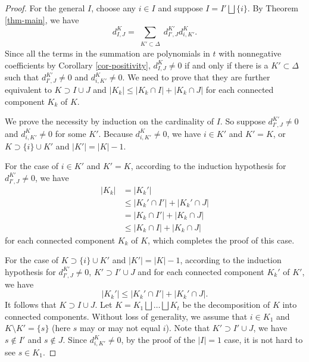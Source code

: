 \documentclass[11pt, letterpaper]{amsart}
\numberwithin{equation}{section}
\begin{document}
\begin{proof}
    For the general $I$, choose any \( i \in I \) and suppose \( I=I' \bigsqcup \{i\}  \). By Theorem \ref{thm-main}, we have  
\[ 
d_{I,J}^K = \sum_{\substack{K'\subset\Delta}} d_{I',J}^{K'} d_{i,K'}^K. 
\]  
    Since all the terms in the summation are polynomials in $t$ with nonnegative coefficients by Corollary \ref{cor-positivity}, \( d_{I,J}^K \neq 0 \) if and only if there is a \(K'\subset\Delta\) such that \( d_{I',J}^{K'}\neq 0\) and \(d_{i,K'}^{K} \neq 0 \). We need to prove that they are further equivalent to $K \supset I \cup J $ and $|K_k|\le|K_k\cap I| + |K_k\cap J|$ for each connected component $K_k$ of $K$. 

We prove the necessity by induction on the cardinality of \( I \). So suppose \( d_{I',J}^{K'}\neq 0\) and \(d_{i,K'}^{K} \neq 0 \) for some $K'$. Because \(d_{i,K'}^{K} \neq 0 \), we have $i\in K'$ and $K'=K$, or \( K\supset\{i\}\cup K' \) and \( |K'| = |K| - 1 \). 

For the case of $i\in K'$ and $K'=K$, according to the induction hypothesis for $d_{I',J}^{K'}\neq 0$, we have
\begin{equation*}
\begin{aligned}
    |K_k|&=|K_k'| \\
    &\le |K_k' \cap I'| + |K_k' \cap J|\\
    &=|K_k \cap I'| + |K_k \cap J|\\
     &\le |K_k \cap I| + |K_k \cap J|
    \end{aligned}
\end{equation*} 
for each connected component $K_k$ of $K$, 
which completes the proof of this case.

For the case of \( K\supset\{i\}\cup K' \) and \( |K'| = |K| - 1 \), according to the induction hypothesis for $d_{I',J}^{K'}\neq 0$, \(K' \supset I '\cup J \) and for each connected component \( K_k' \) of \( K' \),  we have
\begin{equation}\label{eq-K' connected}
    |K_k'| \le |K_k' \cap I'| + |K_k' \cap J|.
\end{equation} 
It follows that \(K \supset I \cup J \).
Let \( K = K_1 \bigsqcup \dots \bigsqcup K_t \) be the decomposition of \( K \) into connected components. Without loss of generality, we assume that \( i \in K_1 \) and \( K \setminus K'=\{s\} \) (here $s$ may or may not equal $i$).  Note that \( K' \supset I '\cup J \), we have \( s \notin I' \) and \( s \notin J \). Since \(d_{i,K'}^{K} \neq 0 \), by the proof of the \(|I|=1\) case, it is not hard to see \(s \in K_1 \).  


\end{proof}
\end{document}
